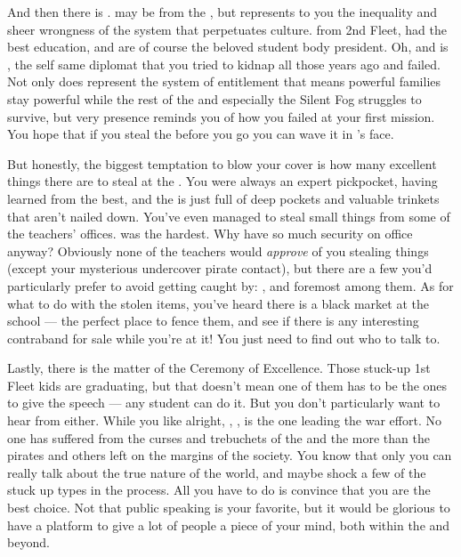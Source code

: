 \documentclass[char]{GL2020}
\begin{document}
And then there is \cPresident{\full}. \cPresident{\they} may be from the \pShip{}, but represents to you the inequality and sheer wrongness of the system that perpetuates \pShippie{} culture.  \cPresident{\Theyare} from 2nd Fleet, had the best education, and are of course the beloved student body president. Oh, and \cPresident{\their} \cPresident{\auncle} is \cHeadDiplomat{}, the self same diplomat that you tried to kidnap all those years ago and failed.  Not only does \cPresident{} represent the system of entitlement that means powerful families stay powerful while the rest of the \pShip{} and especially the Silent Fog struggles to survive, but \cPresident{\their} very presence reminds you of how you failed at your first mission. You hope that if you steal the \iNet{} before you go you can wave it in \cPresident{}’s face.  

But honestly, the biggest temptation to blow your cover is how many excellent things there are to steal at the \pSc{}. You were always an expert pickpocket, having learned from the best, and the \pSc{} is just full of deep pockets and valuable trinkets that aren't nailed down. You've even managed to steal small things from some of the teachers' offices. \cChupInventor{\full} was the hardest. Why \cChupInventor{\do} \cChupInventor{\they} have so much security on \cChupInventor{\their} office anyway? Obviously none of the teachers would \emph{approve} of you stealing things (except your mysterious undercover pirate contact), but there are a few you’d particularly prefer to avoid getting caught by: \cFlowPriest{}, \cInterpol{\full} and \cPrincipal{\full} foremost among them. As for what to do with the stolen items, you've heard there is a black market at the school — the perfect place to fence them, and see if there is any interesting contraband for sale while you're at it! You just need to find out who to talk to.

Lastly, there is the matter of the Ceremony of Excellence. Those stuck-up 1st Fleet kids are graduating, but that doesn't mean one of them has to be the ones to give the speech — any student can do it. But you don't particularly want to hear from \cWarlordDaughter{\full} either. While you like \cWarlordDaughter{} alright, \cWarlordDaughter{\their} \cLoud{\parent}, \cLoud{\full}, is the one leading the war effort. No one has suffered from the curses and trebuchets of the \pFarm{} and the \pTech{} more than the pirates and others left on the margins of the \pShip{} society. You know that only you can really talk about the true nature of the world, and maybe shock a few of the stuck up types in the process. All you have to do is convince \cMusic{\full} that you are the best choice. Not that public speaking is your favorite, but it would be glorious to have a platform to give a lot of people a piece of your mind, both within the \pShippies{} and beyond.
\end{document}
